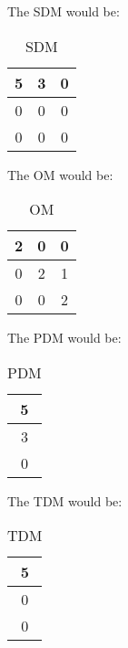 \documentclass[a4paper, 11pt]{article}
\begin{document}
The SDM would be:

\begin{center}
\begin{table}[ht]
    \centering
    \begin{tabular}{||c c c||}
    \hline
    5 & 3 & 0\\
    \hline
    0 & 0 & 0\\
    \hline
    0 & 0 & 0\\
    \hline
    \end{tabular}
    \caption{SDM}
\end{table}
\end{center}

The OM would be:

\begin{center}
\begin{table}[H]
    \centering
    \begin{tabular}{||c c c||}
    \hline
    2 & 0 & 0\\
    \hline
    0 & 2 & 1\\
    \hline
    0 & 0 & 2\\
    \hline
    \end{tabular}
    \caption{OM}
\end{table}
\end{center}

The PDM would be:

\begin{center}
\begin{table}[H]
    \centering
    \begin{tabular}{||c||}
    \hline
    5\\
    \hline
    3\\
    \hline
    0\\
    \hline
    \end{tabular}
    \caption{PDM}
\end{table}
\end{center}

The TDM would be:

\begin{center}
\begin{table}[H]
    \centering
    \begin{tabular}{||c||}
    \hline
    5\\
    \hline
    0\\
    \hline
    0\\
    \hline
    \end{tabular}
    \caption{TDM}
\end{table}
\end{center}
\end{document}

